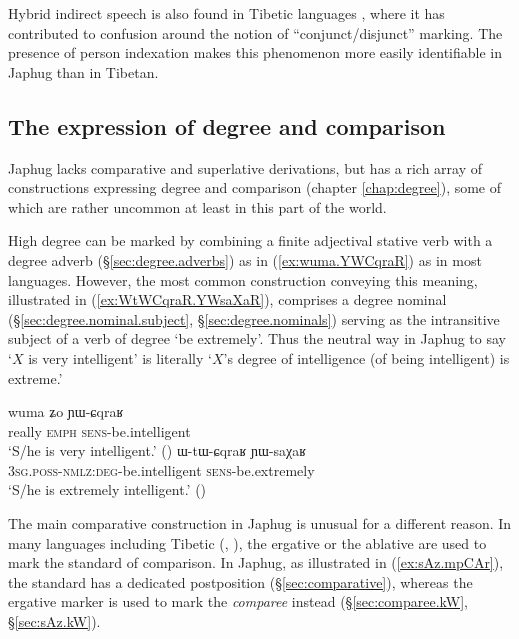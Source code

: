 Hybrid indirect speech is also found in  Tibetic languages \citep{tournadre08conjunct}, where it has contributed to confusion around the notion of ``conjunct/disjunct'' marking. The presence of person indexation makes this phenomenon more easily identifiable in Japhug than in Tibetan.
 
\subsection{The expression of degree and comparison}
Japhug lacks comparative and superlative derivations, but has a rich array of constructions  expressing degree and comparison (chapter \ref{chap:degree}), some of which are rather uncommon at least in this part of the world.

High degree can be marked by combining a finite adjectival stative verb with a degree adverb (§\ref{sec:degree.adverbs}) as in (\ref{ex:wuma.YWCqraR}) as in most languages. However, the most common construction conveying this meaning, illustrated in (\ref{ex:WtWCqraR.YWsaXaR}), comprises a degree nominal (§\ref{sec:degree.nominal.subject}, §\ref{sec:degree.nominals}) serving as the intransitive subject of a verb of degree `be extremely'. Thus the neutral way in Japhug to say `$X$ is very intelligent' is literally `$X$'s degree of intelligence (of being intelligent) is extreme.'

\begin{exe} 
\ex 
\begin{xlist}
\ex \label{ex:wuma.YWCqraR}
\gll wuma ʑo ɲɯ-ɕqraʁ \\
really \textsc{emph} \textsc{sens}-be.intelligent \\
\glt `S/he is very intelligent.' ()
\ex \label{ex:WtWCqraR.YWsaXaR}
\gll ɯ-tɯ-ɕqraʁ ɲɯ-saχaʁ \\
\textsc{3sg}.\textsc{poss}-\textsc{nmlz}:\textsc{deg}-be.intelligent \textsc{sens}-be.extremely \\
\glt `S/he is extremely intelligent.'  ()
\end{xlist}
\end{exe} 

The main comparative construction in Japhug is unusual for a different reason. In many languages including Tibetic (\citealt[239]{vbrugmo03maqu}, \citealt[29]{heine-kuteva02}), the ergative or the  ablative are used to mark the standard of comparison. In Japhug, as illustrated in (\ref{ex:sAz.mpCAr}), the standard has a dedicated postposition (§\ref{sec:comparative}), whereas the ergative marker  is used to mark the \textit{comparee} instead (§\ref{sec:comparee.kW}, §\ref{sec:sAz.kW}). 

